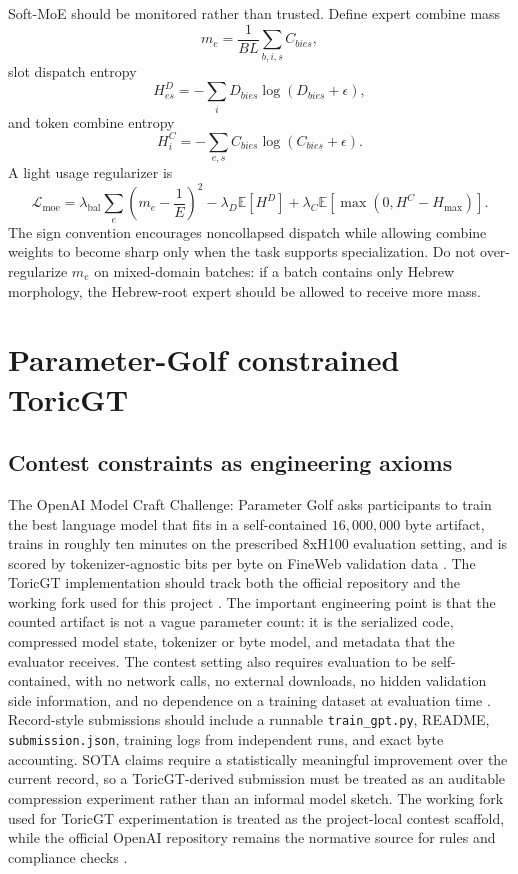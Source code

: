 \documentclass[11pt]{article}
\theoremstyle{definition}
\theoremstyle{plain}
\theoremstyle{remark}
\numberwithin{equation}{section}
\newcommand{\Eop}{\mathbb{E}}
\begin{document}
Soft-MoE should be monitored rather than trusted.  Define expert combine mass
\begin{equation}
  m_e=\frac{1}{B L}\sum_{b,i,s}C_{b i e s},
\end{equation}
slot dispatch entropy
\begin{equation}
  H_{e s}^{D}=-\sum_i D_{b i e s}\log(D_{b i e s}+\epsilon),
\end{equation}
and token combine entropy
\begin{equation}
  H_i^C=-\sum_{e,s}C_{b i e s}\log(C_{b i e s}+\epsilon).
\end{equation}
A light usage regularizer is
\begin{equation}
  \mathcal L_{\mathrm{moe}}=\lambda_{\mathrm{bal}}\sum_e\left(m_e-\frac1E\right)^2
  -\lambda_D\Eop[H^D]+\lambda_C\Eop\left[\max(0,H^C-H_{\max})\right].
\end{equation}
The sign convention encourages noncollapsed dispatch while allowing combine weights to become sharp only when the task supports specialization.  Do not over-regularize $m_e$ on mixed-domain batches: if a batch contains only Hebrew morphology, the Hebrew-root expert should be allowed to receive more mass.

\section{Parameter-Golf constrained ToricGT}

\subsection{Contest constraints as engineering axioms}

The OpenAI Model Craft Challenge: Parameter Golf asks participants to train the best language model that fits in a self-contained $16{,}000{,}000$ byte artifact, trains in roughly ten minutes on the prescribed 8xH100 evaluation setting, and is scored by tokenizer-agnostic bits per byte on FineWeb validation data \cite{openai2026paramgolf}.  The ToricGT implementation should track both the official repository and the working fork used for this project \cite{schreiber2026paramgolf}.  The important engineering point is that the counted artifact is not a vague parameter count: it is the serialized code, compressed model state, tokenizer or byte model, and metadata that the evaluator receives.  The contest setting also requires evaluation to be self-contained, with no network calls, no external downloads, no hidden validation side information, and no dependence on a training dataset at evaluation time \cite{openai2026paramgolf}.  Record-style submissions should include a runnable \texttt{train\_gpt.py}, README, \texttt{submission.json}, training logs from independent runs, and exact byte accounting.  SOTA claims require a statistically meaningful improvement over the current record, so a ToricGT-derived submission must be treated as an auditable compression experiment rather than an informal model sketch.  The working fork used for ToricGT experimentation is treated as the project-local contest scaffold, while the official OpenAI repository remains the normative source for rules and compliance checks \cite{schreiber2026paramgolf}.
\end{document}
